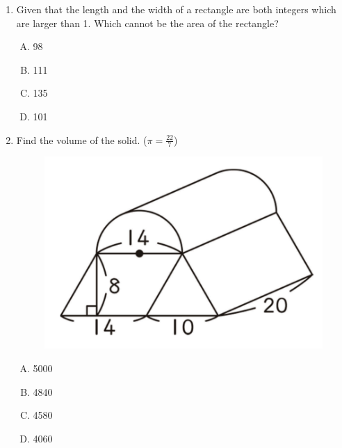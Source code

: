 \documentclass[11pt]{scrartcl}
\begin{document}
\begin{enumerate}
\newpage
\item Given that the length and the width of a rectangle are both integers which are larger than 1. Which cannot be the area of the rectangle?
\begin{enumerate}[(A)]
    \item 98 \item 111 \item 135 \item 101
\end{enumerate}

\item Find the volume of the solid. ($\pi = \frac{22}{7}$)
\begin{figure}[h]
    \centering
    \includegraphics{StarGen/0Figure/wmi-2020-6a-volume-of-solid.png}
\end{figure}
\begin{enumerate}[(A)]
    \item 5000 \item 4840 \item 4580 \item 4060
\end{enumerate}


\end{enumerate}
\end{document}

